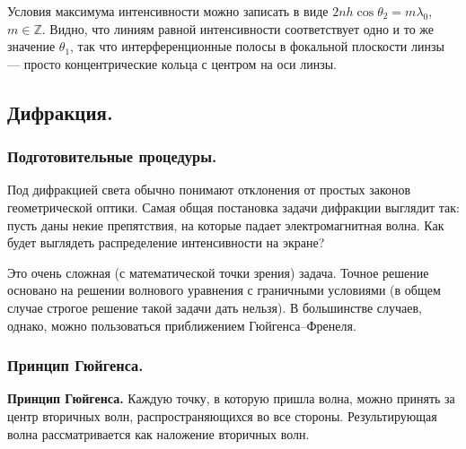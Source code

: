 \documentclass[12pt,a4paper]{article}
\numberwithin{equation}{section}
\numberwithin{equation}{section}
\begin{document}
\begin{center}
\end{center}

Условия максимума интенсивности можно записать в виде $2nh \cos
\theta_2 = m \lambda_0$, $m \in \mathbb{Z}$. Видно, что линиям равной
интенсивности соответствует одно и то же значение $\theta_1$, так что
интерференционные полосы в фокальной плоскости линзы --- просто
концентрические кольца с центром на оси линзы.

\subsection{Дифракция.}
\label{sec:difraction}
\subsubsection{Подготовительные процедуры.}
\label{sec:difraction_intro}

Под дифракцией света обычно понимают отклонения от простых законов
геометрической оптики. Самая общая постановка задачи дифракции
выглядит так: пусть даны некие препятствия, на которые падает
электромагнитная волна. Как будет выглядеть распределение
интенсивности на экране?

Это очень сложная (с математической точки зрения) задача. Точное
решение основано на решении волнового уравнения с граничными условиями
(в общем случае строгое решение такой задачи дать нельзя). В
большинстве случаев, однако, можно пользоваться приближением Гюйгенса--Френеля.

\subsubsection{Принцип Гюйгенса.}
\label{sec:huygens}

\textbf{Принцип Гюйгенса.} Каждую точку, в которую пришла волна, можно принять за центр вторичных волн, распространяющихся во все стороны. Результирующая волна рассматривается как наложение вторичных волн.
\end{document}
